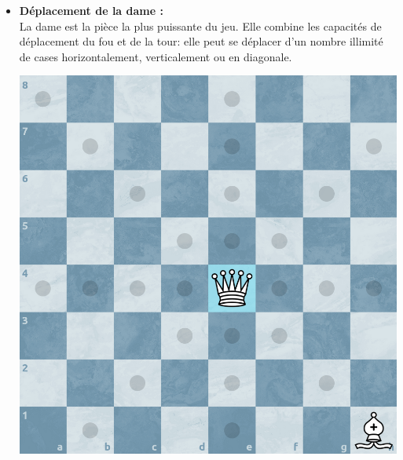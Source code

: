 \documentclass{article}
\begin{document}
\begin{itemize}
    \item \begin{minipage}{0.45\textwidth}
        \textbf{Déplacement de la dame :} \\
        La dame est la pièce la plus puissante du jeu. Elle combine les capacités de déplacement du fou et de la tour:
        elle peut se déplacer d'un nombre illimité de cases horizontalement, verticalement ou en diagonale.
    \end{minipage}
    \hspace{0.05\textwidth}
    \begin{minipage}{0.45\textwidth}
        \centering
        \includegraphics[width=\textwidth]{dameMove.png}
    \end{minipage}

    \vspace{0.5cm}


\end{itemize}
\end{document}
